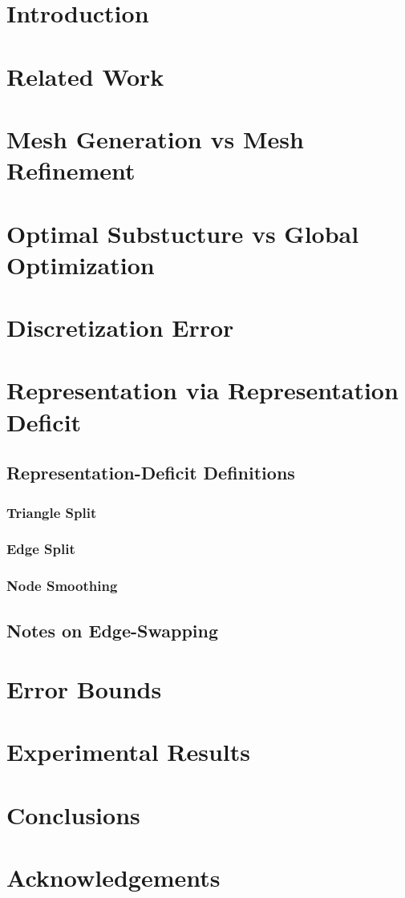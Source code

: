 \documentclass[11pt]{article}
\begin{document}
\section{Introduction}
\section{Related Work}
\section{Mesh Generation vs Mesh Refinement}
\section{Optimal Substucture vs Global Optimization}
\section{Discretization Error}
\section{Representation via Representation Deficit}
\subsection{Representation-Deficit Definitions}
\subsubsection{Triangle Split}
\subsubsection{Edge Split}
\subsubsection{Node Smoothing}
\subsection{Notes on Edge-Swapping}
\section{Error Bounds}
\section{Experimental Results}
\section{Conclusions}
\section{Acknowledgements}
\end{document}
